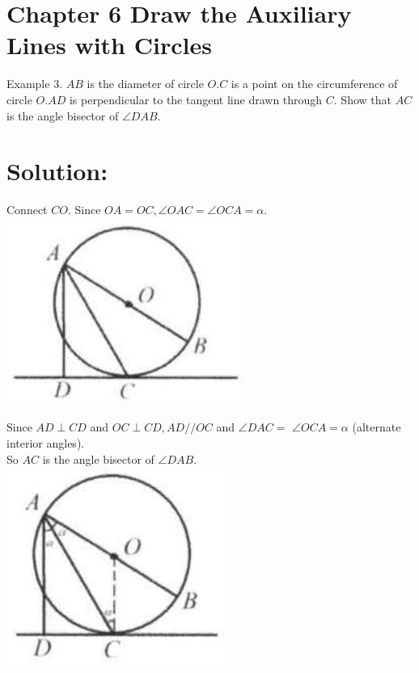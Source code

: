 \documentclass[10pt]{article}
\begin{document}
\section*{Chapter 6 Draw the Auxiliary Lines with Circles}
Example 3. \(A B\) is the diameter of circle \(O . C\) is a point on the circumference of circle \(O . A D\) is perpendicular to the tangent line drawn through \(C\). Show that \(A C\) is the angle bisector of \(\angle D A B\).

\section*{Solution:}
Connect \(C O\). Since \(O A=O C, \angle O A C=\angle O C A=\alpha\).\\
\includegraphics[max width=\textwidth, center]{2025_04_17_97bc1f7e44d93c271a88g-148(4)}

Since \(A D \perp C D\) and \(O C \perp C D, A D / / O C\) and \(\angle D A C=\) \(\angle O C A=\alpha\) (alternate interior angles).\\
So \(A C\) is the angle bisector of \(\angle D A B\).\\
\includegraphics[max width=\textwidth, center]{2025_04_17_97bc1f7e44d93c271a88g-148(1)}
\end{document}
